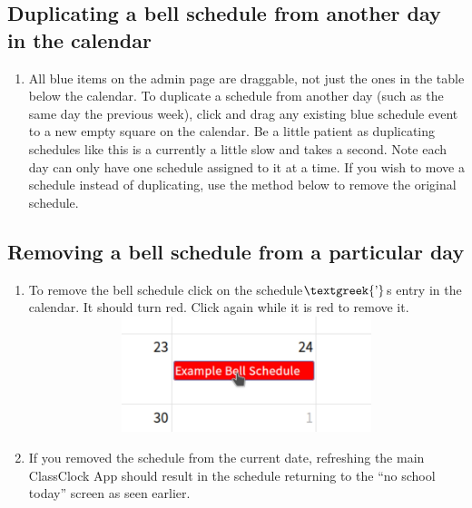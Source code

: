 \documentclass{article}
\begin{document}
\subsection{Duplicating a bell schedule from another day in the calendar}
\begin{enumerate}
\item {All blue items on the admin page are draggable, not just the ones in the table below the calendar. To duplicate a
schedule from another day (such as the same day the previous week), click and drag any existing blue schedule event to
a new empty square on the calendar.\newline
\newline
Be a little patient as duplicating schedules like this is a currently a little slow and takes a second. \newline
\newline
Note each day can only have one schedule assigned to it at a time. If you wish to move a schedule instead of
duplicating, use the method below to remove the original schedule.}
\end{enumerate}
\clearpage\subsection{Removing a bell schedule from a particular day}
\begin{enumerate}
\item {To remove the bell schedule click on the schedule$\text{\textgreek{’}}$s entry in the calendar. It should turn red.
Click again while it is red to remove it.}
\includegraphics[width=6.5in,height=1.3299in]{Mini20Manual-img017.png}
\item {If you removed the schedule from the current date, refreshing the main ClassClock App should result in the schedule
returning to the “no school today” screen as seen earlier.}
\end{enumerate}
\end{document}
